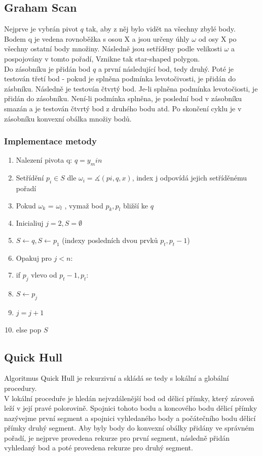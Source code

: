 \documentclass[a4paper, 12pt]{article}
\begin{document}
\subsection{Graham Scan}
Nejprve je vybrán pivot $q$ tak, aby z něj bylo vidět na všechny zbylé body. Bodem q je vedena rovnoběžka s osou X a jsou určeny úhly $\omega$ od osy X po všechny ostatní body množiny. Následně jsou setříděny podle velikosti $\omega$ a pospojovány  v tomto pořadí, Vznikne tak star-shaped polygon.\\
Do zásobníku je přidán bod $q$ a první následující bod, tedy druhý. Poté je testován třetí bod - pokud je splněna podmínka levotočivosti, je přidán do zásbníku. Následně je testován čtvrtý bod. Je-li splněna podmínka levotočiosti, je přidán do zásobníku. Není-li podmínka splněna, je poslední bod v zásobníku smazán a je testován čtvrtý bod z druhého bodu atd. Po skončení cyklu je v zásobníku konvexní obálka množiy bodů.\\

\subsubsection{Implementace metody}
\begin{enumerate}
	\item Nalezení pivota q:  $ q = y_min $ 
	\item Setřídění $ p_i \in S$  dle $\omega_i = \measuredangle (pi, q, x)$, index j odpovídá jejich setříděnému pořadí
	\item Pokud $\omega_k$ = $\omega_l$ , vymaž bod $p_k,p_l$ bližší ke $q$
	\item Inicialiuj $j = 2, S = \emptyset$
	\item $S \longleftarrow q, S \longleftarrow p_1$ (indexy posledních dvou prvků $p_t, p_t-1$) 
	\item Opakuj pro $j < n:$
	\item \hspace {1cm} if $p_j$ vlevo od $p_t-1, p_t:$
	\item \hspace {1.5cm} $S \longleftarrow p_j $
	\item  \hspace {1.5cm} $j = j + 1$
	\item \hspace {1cm} else pop $S$	
\end{enumerate}


\clearpage

\subsection{Quick Hull}
Algoritmus Quick Hull je rekurzivní a skládá se tedy s lokální a globální procedury.\\
V lokální proceduře je hledán nejvzdálenější bod od dělicí přímky, který zároveň leží v její pravé polorovině. Spojnici tohoto bodu a koncového bodu dělicí přímky nazývejme první segment a spojnici vyhledaného body a počátečního bodu dělicí přímky druhý segment. Aby byly body do konvexní obálky přidány ve správném pořadí, je nejprve provedena rekurze pro první segment, následně přidán vyhledaný bod a poté provedena rekurze pro druhý segment.
\end{document}
